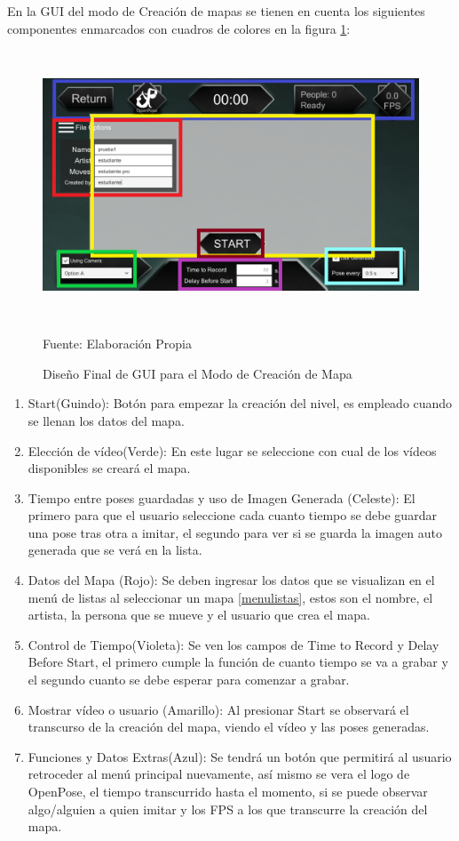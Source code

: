 En la GUI del modo de Creación de mapas se tienen en cuenta los siguientes componentes enmarcados con cuadros de colores en la figura \ref{guicrearmapa}:
\begin{figure}[t!]
	\centering
	\includegraphics[width=14cm,height=8cm,]{./Images/guicrearmapa.png}
	\caption{Diseño Final de GUI para el Modo de Creación de Mapa}
	\footnotesize Fuente: Elaboración Propia
	\label{guicrearmapa}
\end{figure}
\begin{enumerate}
	\item Start(Guindo): Botón para empezar la creación del nivel, es empleado cuando se llenan los datos del mapa.
	\item Elección de vídeo(Verde): En este lugar se seleccione con cual de los vídeos disponibles se creará el mapa.
	\item Tiempo entre poses guardadas y uso de Imagen Generada (Celeste): El primero para que el usuario seleccione cada cuanto tiempo se debe guardar una pose tras otra a imitar, el segundo para ver si se guarda la imagen auto generada que se verá en la lista.
	\item Datos del Mapa (Rojo): Se deben ingresar los datos que se visualizan en el menú de listas al seleccionar un mapa \ref{menulistas}, estos son el nombre, el artista, la persona que se mueve y el usuario que crea el mapa.
	\item Control de Tiempo(Violeta): Se ven los campos de Time to Record y Delay Before Start, el primero cumple la función de cuanto tiempo se va a grabar y el segundo cuanto se debe esperar para comenzar a grabar.
	\item Mostrar vídeo o usuario (Amarillo): Al presionar Start se observará el transcurso de la creación del mapa, viendo el vídeo y las poses generadas.
	\item Funciones y Datos Extras(Azul): Se tendrá un botón que permitirá al usuario retroceder al menú principal nuevamente, así mismo se vera el logo de OpenPose, el tiempo transcurrido hasta el momento, si se puede observar algo/alguien a quien imitar y los FPS a los que transcurre la creación del mapa.
\end{enumerate}





